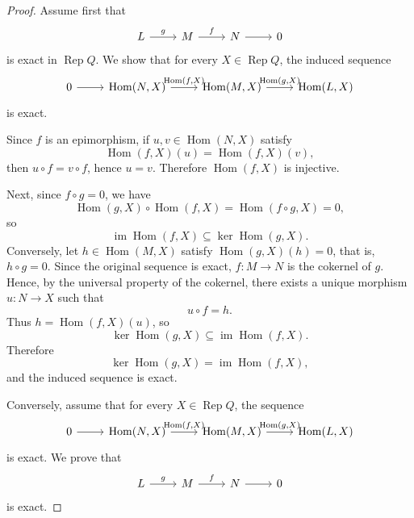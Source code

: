 \documentclass[11pt, a4paper]{report}
\begin{document}
\begin{proof}
    Assume first that
    \[
        \begin{tikzcd}
            L \arrow[r,"g"] & M \arrow[r,"f"] & N \arrow[r] & 0
        \end{tikzcd}
    \]
    is exact in $\operatorname{Rep}Q$. We show that for every $X \in \operatorname{Rep}Q$, the induced sequence
    \[
        \begin{tikzcd}
            0 \arrow[r] & {\operatorname{Hom}(N,X)} \arrow[r,"{\operatorname{Hom}(f,X)}"] &
            {\operatorname{Hom}(M,X)} \arrow[r,"{\operatorname{Hom}(g,X)}"] &
            \operatorname{Hom}(L,X)
        \end{tikzcd}
    \]
    is exact.

    Since $f$ is an epimorphism, if $u,v \in \operatorname{Hom}(N,X)$ satisfy
    \[
        \operatorname{Hom}(f,X)(u)=\operatorname{Hom}(f,X)(v),
    \]
    then $u\circ f=v\circ f$, hence $u=v$. Therefore $\operatorname{Hom}(f,X)$ is injective.

    Next, since $f\circ g=0$, we have
    \[
        \operatorname{Hom}(g,X)\circ \operatorname{Hom}(f,X)
        =\operatorname{Hom}(f\circ g,X)=0,
    \]
    so
    \[
        \operatorname{im}\operatorname{Hom}(f,X)\subseteq \ker \operatorname{Hom}(g,X).
    \]
    Conversely, let $h \in \operatorname{Hom}(M,X)$ satisfy $\operatorname{Hom}(g,X)(h)=0$, that is, $h\circ g=0$. Since the original sequence is exact, $f:M\to N$ is the cokernel of $g$. Hence, by the universal property of the cokernel, there exists a unique morphism $u:N\to X$ such that
    \[
        u\circ f=h.
    \]
    Thus $h=\operatorname{Hom}(f,X)(u)$, so
    \[
        \ker \operatorname{Hom}(g,X)\subseteq \operatorname{im}\operatorname{Hom}(f,X).
    \]
    Therefore
    \[
        \ker \operatorname{Hom}(g,X)=\operatorname{im}\operatorname{Hom}(f,X),
    \]
    and the induced sequence is exact.

    Conversely, assume that for every $X \in \operatorname{Rep}Q$, the sequence
    \[
        \begin{tikzcd}
            0 \arrow[r] & {\operatorname{Hom}(N,X)} \arrow[r,"{\operatorname{Hom}(f,X)}"] &
            {\operatorname{Hom}(M,X)} \arrow[r,"{\operatorname{Hom}(g,X)}"] &
            \operatorname{Hom}(L,X)
        \end{tikzcd}
    \]
    is exact. We prove that
    \[
        \begin{tikzcd}
            L \arrow[r,"g"] & M \arrow[r,"f"] & N \arrow[r] & 0
        \end{tikzcd}
    \]
    is exact.


\end{proof}
\end{document}
